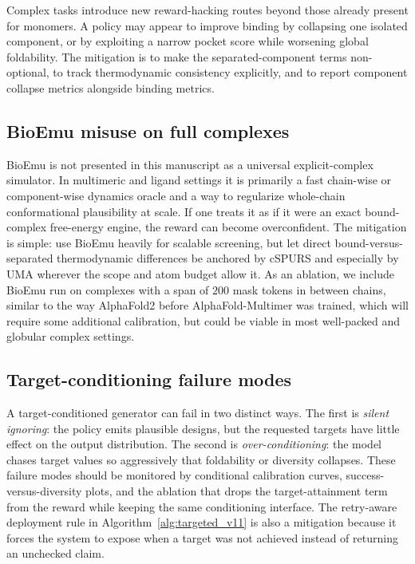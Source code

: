 \documentclass[11pt]{article}
\begin{document}
Complex tasks introduce new reward-hacking routes beyond those already present for monomers. A policy may appear to improve binding by collapsing one isolated component, or by exploiting a narrow pocket score while worsening global foldability. The mitigation is to make the separated-component terms non-optional, to track thermodynamic consistency explicitly, and to report component collapse metrics alongside binding metrics.

\subsection{BioEmu misuse on full complexes}

BioEmu is not presented in this manuscript as a universal explicit-complex simulator. In multimeric and ligand settings it is primarily a fast chain-wise or component-wise dynamics oracle and a way to regularize whole-chain conformational plausibility at scale. If one treats it as if it were an exact bound-complex free-energy engine, the reward can become overconfident. The mitigation is simple: use BioEmu heavily for scalable screening, but let direct bound-versus-separated thermodynamic differences be anchored by cSPURS and especially by UMA wherever the scope and atom budget allow it. As an ablation, we include BioEmu run on complexes with a span of $200$ mask tokens in between chains, similar to the way AlphaFold2 before AlphaFold-Multimer was trained, which will require some additional calibration, but could be viable in most well-packed and globular complex settings. 

\subsection{Target-conditioning failure modes}

A target-conditioned generator can fail in two distinct ways. The first is \emph{silent ignoring}: the policy emits plausible designs, but the requested targets have little effect on the output distribution. The second is \emph{over-conditioning}: the model chases target values so aggressively that foldability or diversity collapses. These failure modes should be monitored by conditional calibration curves, success-versus-diversity plots, and the ablation that drops the target-attainment term from the reward while keeping the same conditioning interface. The retry-aware deployment rule in Algorithm~\ref{alg:targeted_v11} is also a mitigation because it forces the system to expose when a target was not achieved instead of returning an unchecked claim.
\end{document}
